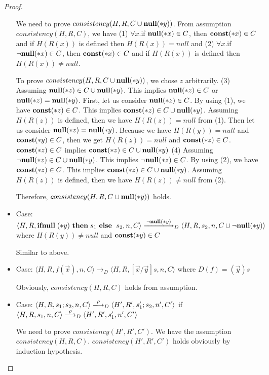 \begin{proof}
\begin{itemize}
  We need to prove \(consistency(H, R, C\cup{\mathbf{null}(*y)}) \). From
  assumption \(consistency(H, R, C)\), we have (1) \(\forall x\).if
  \({\bf null}(*x) \in C\), then \(\mathbf{const}(*x) \in C\) and if \(H(R(x))\) is
  defined then \(H(R(x)) = null\) and (2) \(\forall x\).if \(\neg{\bf null}(*x)
  \in C\), then \(\mathbf{const}(*x) \in C\) and if \(H(R(x))\) is defined
  then \(H(R(x)) \ne null\).

  To prove \(consistency(H, R, C\cup{\mathbf{null}(*y)}) \), we chose \(z\)
  arbitrarily. (3) Assuming \(\mathbf{null}(*z) \in C\cup\mathbf{null}(*y)\). This
  implies \(\mathbf{null}(*z) \in C\) or \(\mathbf{null}(*z) = \mathbf{null}(*y)\). First, let
  us consider \(\mathbf{null}(*z) \in C\). By using (1), we have \(\mathbf{const}(*z)
  \in C\). This implies \(\mathbf{const}(*z) \in C\cup\mathbf{null}(*y)\). Assuming
  \(H(R(z))\) is defined, then we have \(H(R(z)) = null\) from
  (1). Then let us consider \(\mathbf{null}(*z) = \mathbf{null}(*y)\). Because we have
  \( H(R(y)) = null \) and \(\mathbf{const}(*y) \in C\), then we get \( H(R(z))
  = null \) and \(\mathbf{const}(*z) \in C\). \(\mathbf{const}(*z) \in C\) implies
  \(\mathbf{const}(*z) \in C\cup\mathbf{null}(*y)\) (4) Assuming \(\neg\mathbf{null}(*z) \in
  C\cup\mathbf{null}(*y)\). This implies \(\neg\mathbf{null}(*z) \in C\). By using
  (2), we have \(\mathbf{const}(*z) \in C\). This implies \(\mathbf{const}(*z) \in
  C\cup\mathbf{null}(*y)\). Assuming \(H(R(z))\) is defined, then we have
  \(H(R(z)) \ne null\) from (2).

  Therefore, \(consistency(H, R, C\cup{\mathbf{null}(*y)})\) holds.

\item Case: \(\langle H, R, \IFNULL(*y) \ \THEN s_1\ \ELSE\ s_2, n, C
  \rangle \xlongrightarrow{\neg\NULL(*y)}_D \langle H, R, s_2, n, C \cup{\neg\NULL(*y)}
  \rangle \) where \( H(R(y)) \ne  null \) and \(\mathbf{const}(*y) \in C\)

  Similar to above.  

\item Case: \(\langle H, R, f(\vec{x}), n, C \rangle \rightarrow_D
  \langle H, R, [\vec{x}/\vec{y}]s, n, C \rangle \) where \( D(f) = (\vec{y})s\)

  Obviously, \(consistency(H, R, C) \) holds from assumption.

\item Case: \(\langle H, R, s_1;s_2, n, C \rangle
  \xlongrightarrow{\rho}_{D} \langle H', R', s_1';s_2, n', C' \rangle
  \) if \(\langle H, R, s_1, n, C \rangle \xlongrightarrow{\rho}_{D}
  \langle H', R', s_1', n', C' \rangle\)

  We need to prove \(consistency(H', R', C')\). We have the assumption
  \(consistency(H, R, C)\). \(consistency(H', R', C')\) holds
  obviously by induction hypothesis.
  
 \end{itemize}
\end{proof}


